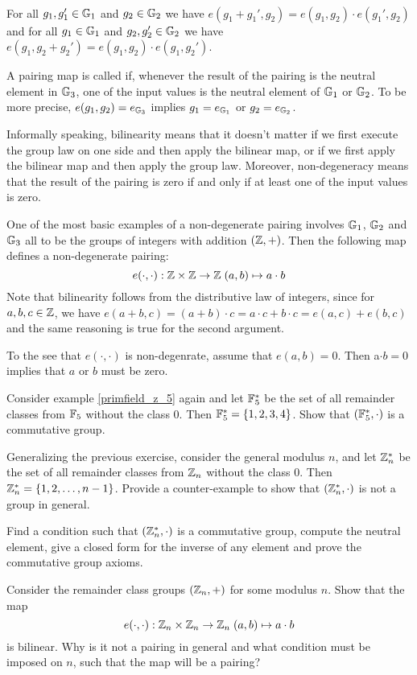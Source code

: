 \begin{definition}{}\\
For all $g_1,g_1'\in \mathbb{G}_1$ and $g_2\in \mathbb{G}_2$ we have $e(g_1+ g_1',g_2)= e(g_1,g_2)\cdot e(g_1',g_2)$ and for all $g_1\in \mathbb{G}_1$ and $g_2, g_2'\in \mathbb{G}_2$ we have $e(g_1,g_2+ g_2')= e(g_1,g_2)\cdot e(g_1,g_2')$.
\end{definition}

A pairing map is called  if, whenever the result of the pairing is the neutral element in $\mathbb{G}_3$, one of the input values is the neutral element of $\mathbb{G}_1$ or $\mathbb{G}_2$. To be more precise, $e(g_1,g_2)=e_{\mathbb{G}_3}$ implies $g_1=e_{\mathbb{G}_1}$ or $g_2=e_{\mathbb{G}_2}$.

Informally speaking, bilinearity means that it doesn't matter if we first execute the group law on one side and then apply the bilinear map, or if we first apply the bilinear map and then apply the group law. Moreover, non-degeneracy means that the result of the pairing is zero if and only if at least one of the input values is zero.
\begin{example}One of the most basic examples of a non-degenerate pairing involves $\mathbb{G}_1$, $\mathbb{G}_2$ and $\mathbb{G}_3$ all to be the groups of integers with addition $(\mathbb{Z},+)$. Then the following map defines a non-degenerate pairing:
$$
e(\cdot,\cdot): \mathbb{Z} \times \mathbb{Z} \to \mathbb{Z} \; (a,b)\mapsto a\cdot b
$$
Note that bilinearity follows from the distributive law of integers, since for $a,b,c\in \mathbb{Z}$, we have $e(a+b,c)=(a+b)\cdot c = a\cdot c + b\cdot c = e(a,c)+ e(b,c)$ and the same reasoning is true for the second argument.

To the see that $e(\cdot,\cdot)$ is non-degenrate, assume that $e(a,b)=0$. Then a$\cdot b =0$ implies that $a$ or $b$ must be zero.
\end{example}

\begin{exercise}\label{fstar} Consider example \ref{primfield_z_5}
 again and let $\mathbb{F}_5^*$ be the set of all remainder classes from $\mathbb{F}_5$ without the class $0$. Then $\mathbb{F}_5^*=\{1,2,3,4\}$. Show that $(\mathbb{F}_5^*,\cdot)$ is a commutative group.
\end{exercise}
\begin{exercise}\label{ex:Zn*} Generalizing the previous exercise, consider the general modulus $n$, and let $\mathbb{Z}_n^*$ be the set of all remainder classes from $\mathbb{Z}_n$ without the class $0$. Then $\mathbb{Z}_n^*=\{1,2,\ldots,n-1\}$. Provide a counter-example to show that $(\mathbb{Z}^*_n,\cdot)$ is not a group in general.

Find a condition such that $(\mathbb{Z}^*_n,\cdot)$ is a commutative group, compute the neutral element, give a closed form for the inverse of any element and prove the commutative group axioms.
\end{exercise}
\begin{exercise} Consider the remainder class groups $(\mathbb{Z}_n,+)$ for some modulus $n$. Show that the map
$$
e(\cdot,\cdot): \mathbb{Z}_n \times \mathbb{Z}_n \to \mathbb{Z}_n \; (a,b)\mapsto a\cdot b
$$
is bilinear. Why is it not a pairing in general and what condition must be imposed on $n$, such that the map will be a pairing?
\end{exercise}
